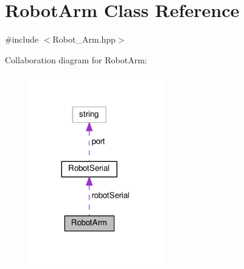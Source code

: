 \hypertarget{class_robot_arm}{}\section{Robot\+Arm Class Reference}
\label{class_robot_arm}


{\ttfamily \#include $<$Robot\+\_\+\+Arm.\+hpp$>$}



Collaboration diagram for Robot\+Arm\+:\nopagebreak
\begin{figure}[H]
\begin{center}
\leavevmode
\includegraphics[width=164pt]{class_robot_arm__coll__graph}
\end{center}
\end{figure}

